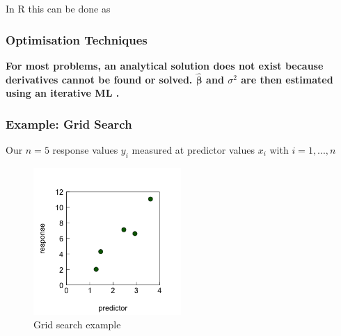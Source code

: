 \documentclass{beamer}
\begin{document}
\begin{frame}{In R this can be done as}
    \scalebox{0.8}{
      
      }    
\end{frame}

\begin{frame}
    \frametitle{Optimisation Techniques}
    \textbf{For most problems, an analytical solution does not exist because derivatives cannot be found or solved. $\mathbf{\hat{\beta}}$ and $\sigma^2$ are then estimated using an iterative ML \color{blue}{optimisation procedure}.}
\end{frame}

\begin{frame}
    \frametitle{Example: Grid Search}
    Our $n = 5$ response values $y_i$ measured at predictor values $x_i$ with $i = 1,...,n$
    
    \begin{figure}[h]
        \centering
        \includegraphics[width=0.5\textwidth]{lectures/day_2_LM_refresh_I/figures/unnamed-chunk-22-1.png} 
        \caption{Grid search example}
    \end{figure}
\end{frame}
\end{document}
